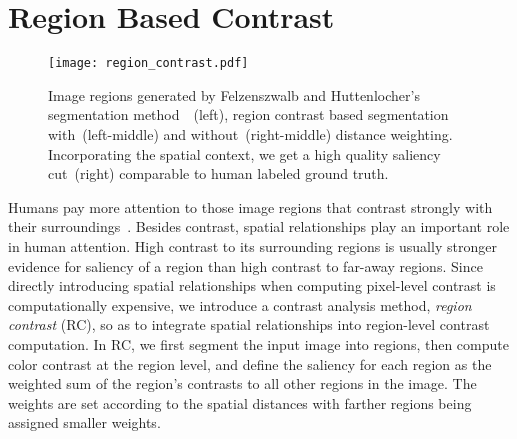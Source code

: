 \documentclass[10pt,twocolumn,letterpaper]{article}
\newcommand{\vnudge}{\vspace*{-.1in}}
\begin{document}
\section{Region Based Contrast}

\begin{figure}
    \centering
    \texttt{[image: region\_contrast.pdf]}\\
    \caption{Image regions generated by Felzenszwalb and Huttenlocher's
      segmentation method~\cite{04ijcv/felzenszwalb_efficient}~(left),
      region contrast based segmentation with~(left-middle) and without~(right-middle) distance weighting.
      Incorporating the spatial context, we get a high quality saliency cut~(right) comparable to
      human labeled ground truth.
    }\label{fig:regContrast} \vnudge
\end{figure}


Humans pay more attention to those image regions that contrast strongly with their
surroundings~\cite{03neuroscience/luminanceContrast}.
%
Besides contrast, spatial relationships play an  important role in human attention.
%
High contrast to its surrounding regions is usually stronger evidence for
saliency of a region than high contrast to far-away regions.
%
Since directly introducing spatial relationships when computing pixel-level contrast is
computationally expensive, we introduce a   contrast analysis method, \emph{region contrast} (RC),
so as to integrate spatial relationships into region-level contrast computation.
%
In RC, we first segment the input image into regions, then compute color contrast at the region level,
and define the saliency for each region as the weighted sum of the region's contrasts
to all other regions in the image.
%
The weights are set according to the spatial distances with farther regions being assigned smaller
weights.


\end{document}
